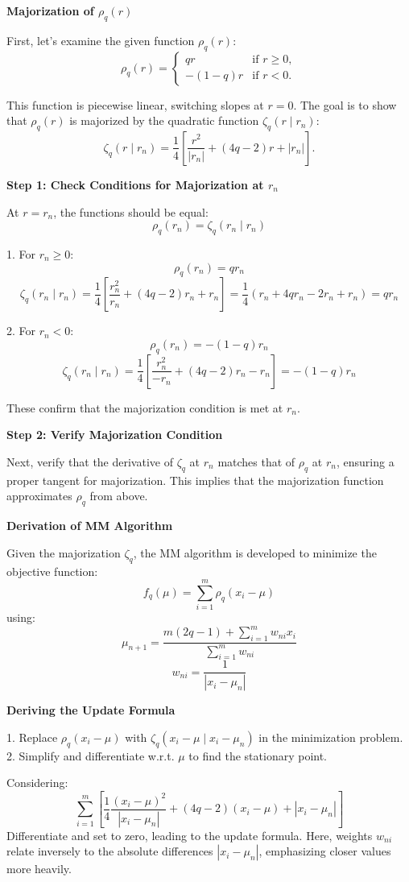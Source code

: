 \documentclass[8pt]{article}
\begin{document}
{\textbf{Majorization of \(\rho_q(r)\)}

First, let's examine the given function \(\rho_q(r)\):
\[
\rho_q(r) = \begin{cases} 
qr & \text{if } r \geq 0, \\ 
-(1 - q)r & \text{if } r < 0.
\end{cases}
\]

This function is piecewise linear, switching slopes at \(r = 0\). The goal is to show that \(\rho_q(r)\) is majorized by the quadratic function \(\zeta_q(r \mid r_n)\):
\[
\zeta_q(r \mid r_n) = \frac{1}{4} \left[ \frac{r^2}{|r_n|} + (4q - 2)r + |r_n| \right].
\]

\textbf{Step 1: Check Conditions for Majorization at \(r_n\)}

At \(r = r_n\), the functions should be equal:
\[
\rho_q(r_n) = \zeta_q(r_n \mid r_n)
\]

1. For \(r_n \geq 0\):
   \[
   \rho_q(r_n) = qr_n
   \]
   \[
   \zeta_q(r_n \mid r_n) = \frac{1}{4} \left[ \frac{r_n^2}{r_n} + (4q - 2)r_n + r_n \right] = \frac{1}{4} (r_n + 4qr_n - 2r_n + r_n) = qr_n
   \]

2. For \(r_n < 0\):
   \[
   \rho_q(r_n) = -(1-q)r_n
   \]
   \[
   \zeta_q(r_n \mid r_n) = \frac{1}{4} \left[ \frac{r_n^2}{-r_n} + (4q - 2)r_n - r_n \right] = -(1-q)r_n
   \]

These confirm that the majorization condition is met at \(r_n\).

\textbf{Step 2: Verify Majorization Condition}

Next, verify that the derivative of \(\zeta_q\) at \(r_n\) matches that of \(\rho_q\) at \(r_n\), ensuring a proper tangent for majorization. This implies that the majorization function approximates \(\rho_q\) from above.

\textbf{Derivation of MM Algorithm}

Given the majorization \(\zeta_q\), the MM algorithm is developed to minimize the objective function:
\[
f_q(\mu) = \sum_{i=1}^m \rho_q(x_i - \mu)
\]
using:
\[
\mu_{n+1} = \frac{m(2q - 1) + \sum_{i=1}^m w_{ni} x_i}{\sum_{i=1}^m w_{ni}}
\]
\[
w_{ni} = \frac{1}{|x_i - \mu_n|}
\]

\textbf{Deriving the Update Formula}

1. Replace \(\rho_q(x_i - \mu)\) with \(\zeta_q(x_i - \mu \mid x_i - \mu_n)\) in the minimization problem.
2. Simplify and differentiate w.r.t. \(\mu\) to find the stationary point.

Considering:
\[
\sum_{i=1}^m \left[\frac{1}{4} \frac{(x_i - \mu)^2}{|x_i - \mu_n|} + (4q - 2)(x_i - \mu) + |x_i - \mu_n|\right]
\]
Differentiate and set to zero, leading to the update formula. Here, weights \(w_{ni}\) relate inversely to the absolute differences \(|x_i - \mu_n|\), emphasizing closer values more heavily.

}
\end{document}
